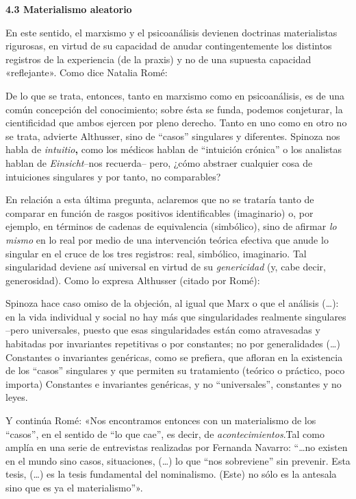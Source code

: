 \textbf{4.3 Materialismo aleatorio }

En este sentido, el marxismo y el psicoanálisis devienen doctrinas materialistas rigurosas, en virtud de su capacidad de anudar contingentemente los distintos registros de la experiencia (de la praxis) y no de una supuesta capacidad «reflejante». Como dice Natalia Romé:

De lo que se trata, entonces, tanto en marxismo como en psicoanálisis, es de una común concepción del conocimiento; sobre ésta se funda, podemos conjeturar, la cientificidad que ambos ejercen por pleno derecho. Tanto en uno como en otro no se trata, advierte Althusser, sino de ``casos'' singulares y diferentes. Spinoza nos habla de \emph{intuitio}\textbf{,} como los médicos hablan de ``intuición crónica'' o los analistas hablan de \emph{Einsicht}--nos recuerda-- pero, ¿cómo abstraer cualquier cosa de intuiciones singulares y por tanto, no comparables?

En relación a esta última pregunta, aclaremos que no se trataría tanto de comparar en función de rasgos positivos identificables (imaginario) o, por ejemplo, en términos de cadenas de equivalencia (simbólico), sino de afirmar \emph{lo mismo }en lo real por medio de una intervención teórica efectiva que anude lo singular en el cruce de los tres registros: real, simbólico, imaginario. Tal singularidad deviene así universal en virtud de su \emph{genericidad }(y, cabe decir, generosidad). Como lo expresa Althusser (citado por Romé):

Spinoza hace caso omiso de la objeción, al igual que Marx o que el análisis (\ldots): en la vida individual y social no hay más que singularidades realmente singulares --pero universales, puesto que esas singularidades están como atravesadas y habitadas por invariantes repetitivas o por constantes; no por generalidades (\ldots) Constantes o invariantes genéricas, como se prefiera, que afloran en la existencia de los ``casos'' singulares y que permiten su tratamiento (teórico o práctico, poco importa) Constantes e invariantes genéricas, y no ``universales'', constantes y no leyes.

Y continúa Romé: «Nos encontramos entonces con un materialismo de los ``casos'', en el sentido de ``lo que cae'', es decir, de \emph{acontecimientos}.Tal como amplía en una serie de entrevistas realizadas por Fernanda Navarro: ``\ldots no existen en el mundo sino casos, situaciones, (\ldots) lo que ``nos sobreviene'' sin prevenir. Esta tesis, (\ldots) es la tesis fundamental del nominalismo. (Este) no sólo es la antesala sino que es ya el materialismo''».

